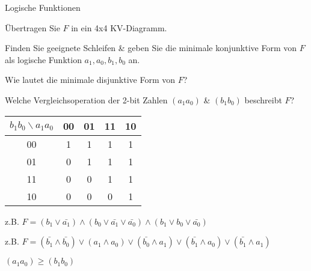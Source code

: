 \documentclass{exercisesheet}
\begin{document}
  \begin{exercise}{Logische Funktionen}
    \item Übertragen Sie $F$ in ein 4x4 KV-Diagramm.
    \item Finden Sie geeignete Schleifen \& geben Sie die minimale konjunktive Form von $F$ als logische Funktion $a_1, a_0, b_1, b_0$ an.
    \item Wie lautet die minimale disjunktive Form von $F$?
    \item Welche Vergleichsoperation der 2-bit Zahlen $(a_1a_0)$ \& $(b_1b_0)$ beschreibt $F$?
  \end{exercise}

  \begin{solution}
    \item
      \begin{tabular}{c|cccc}
        $b_1b_0 \backslash a_1a_0$ & 00 & 01 & 11 & 10\\
        \hline
        00 & 1 & 1 & 1 & 1\\
        01 & 0 & 1 & 1 & 1\\
        11 & 0 & 0 & 1 & 1\\
        10 & 0 & 0 & 0 & 1\\
      \end{tabular}
    \item z.B. $F = (b_1 \lor \bar{a_1}) \land (b_0\lor \bar{a_1}\lor \bar{a_0}) \land (b_1\lor b_0\lor\bar{a_0})$
    \item z.B. $F = (\bar{b_1}\land\bar{b_0}) \lor (a_1\land a_0) \lor (\bar{b_0}\land a_1) \lor (\bar{b_1}\land a_0)\lor(\bar{b_1}\land a_1)$
    \item $(a_1a_0) \geq (b_1b_0)$
  \end{solution}
\end{document}
